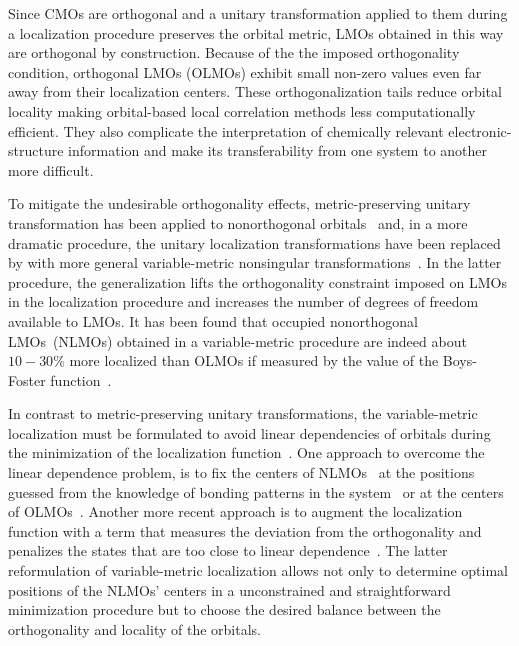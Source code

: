 \documentclass[aps,prl,reprint,amsmath,amssymb]{revtex4-1}
\begin{document}
Since CMOs are orthogonal and a unitary transformation applied to them during a localization procedure preserves the orbital metric, LMOs obtained in this way are orthogonal by construction.
Because of the the imposed orthogonality condition, orthogonal LMOs (OLMOs) exhibit small non-zero values even far away from their localization centers. 
These orthogonalization tails reduce orbital locality making orbital-based local correlation methods less computationally efficient. 
They also complicate the interpretation of chemically relevant electronic-structure information and make its transferability from one system to another more difficult. 

To mitigate the undesirable orthogonality effects, metric-preserving unitary transformation has been applied to nonorthogonal orbitals~\cite{hoyvik2017generalising} and, in a more dramatic procedure, the unitary localization transformations have been replaced by with more general variable-metric nonsingular transformations~\cite{anderson1968self, diner1968fully, magnasco1974localized, payne1977hartree, mehler1977self, feng2004An_efficient, cui2010efficient, luo2020direct}. 
In the latter procedure, the generalization lifts the orthogonality constraint imposed on LMOs in the localization procedure and increases the number of degrees of freedom available to LMOs. 
It has been found that occupied nonorthogonal LMOs~(NLMOs) obtained in a variable-metric procedure are indeed about $10-30\%$ more localized than OLMOs if measured by the value of the Boys-Foster function~\cite{feng2004An_efficient, liu2000nonorthogonal, luo2020direct}. 

In contrast to metric-preserving unitary transformations, the variable-metric localization must be formulated to avoid
linear dependencies of orbitals during the minimization of the localization function~\cite{liu2000nonorthogonal, feng2004An_efficient, cui2010efficient, peng2013effective}. 
One approach to overcome the linear dependence problem, is to fix the centers of NLMOs~\cite{feng2004An_efficient, cui2010efficient} at the positions guessed from the knowledge of bonding patterns in the system~\cite{cui2010efficient} or at the centers of OLMOs~\cite{feng2004An_efficient}. 
Another more recent approach is to augment the localization function with a term that measures the deviation from the orthogonality and penalizes the states that are too close to linear dependence~\cite{luo2020direct}. The latter reformulation of variable-metric localization allows not only to determine optimal positions of the NLMOs' centers in a unconstrained and straightforward minimization procedure but to choose the desired balance between the orthogonality and locality of the orbitals. 
\end{document}
